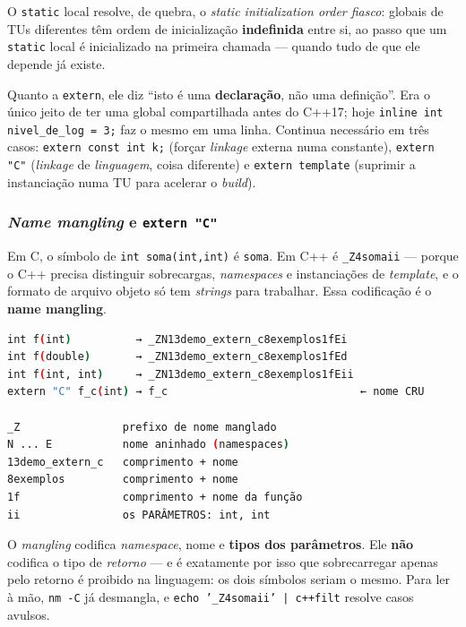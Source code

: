 O \texttt{static} local resolve, de quebra, o \emph{static initialization order
fiasco}: globais de TUs diferentes têm ordem de inicialização
\textbf{indefinida} entre si, ao passo que um \texttt{static} local é
inicializado na primeira chamada --- quando tudo de que ele depende já existe.

Quanto a \texttt{extern}, ele diz ``isto é uma \textbf{declaração}, não uma
definição''. Era o único jeito de ter uma global compartilhada antes do C++17;
hoje \texttt{inline int nivel\_de\_log = 3;} faz o mesmo em uma linha. Continua
necessário em três casos: \texttt{extern const int k;} (forçar \emph{linkage}
externa numa constante), \texttt{extern "C"} (\emph{linkage} de
\emph{linguagem}, coisa diferente) e \texttt{extern template} (suprimir a
instanciação numa TU para acelerar o \emph{build}).

\subsubsection{\emph{Name mangling} e \texttt{extern "C"}}

Em C, o símbolo de \texttt{int soma(int,int)} é \texttt{soma}. Em C++ é
\texttt{\_Z4somaii} --- porque o C++ precisa distinguir sobrecargas,
\emph{namespaces} e instanciações de \emph{template}, e o formato de arquivo
objeto só tem \emph{strings} para trabalhar. Essa codificação é o \textbf{name
mangling}.

\begin{lstlisting}[style=bt, language=bash,
    caption={Saída de \texttt{src/linkage/}: os símbolos reais do binário,
             copiados de \texttt{nm}.}]
int f(int)          → _ZN13demo_extern_c8exemplos1fEi
int f(double)       → _ZN13demo_extern_c8exemplos1fEd
int f(int, int)     → _ZN13demo_extern_c8exemplos1fEii
extern "C" f_c(int) → f_c                              ← nome CRU

_Z                prefixo de nome manglado
N ... E           nome aninhado (namespaces)
13demo_extern_c   comprimento + nome
8exemplos         comprimento + nome
1f                comprimento + nome da função
ii                os PARÂMETROS: int, int
\end{lstlisting}

O \emph{mangling} codifica \emph{namespace}, nome e \textbf{tipos dos
parâmetros}. Ele \textbf{não} codifica o tipo de \emph{retorno} --- e é
exatamente por isso que sobrecarregar apenas pelo retorno é proibido na
linguagem: os dois símbolos seriam o mesmo. Para ler à mão, \texttt{nm -C} já
desmangla, e \texttt{echo '\_Z4somaii' | c++filt} resolve casos avulsos.

